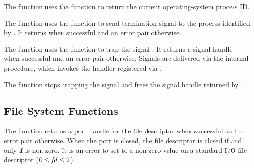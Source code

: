 \begin{function}
\end{function}

The  function uses the 
function to return the current operating-system process ID.

\begin{function}
\end{function}

The  function uses the  function to
send termination signal  to the process identified by
. It returns  when successful and an error pair
otherwise.

\begin{function}
\end{function}

The  function uses the 
function to trap the signal .
It returns a signal handle when successful and an error pair
otherwise.
Signals are delivered via the internal  procedure, which
invokes the handler registered via .

\begin{function}
\end{function}

The  function stops trapping the signal
and frees the signal handle returned by .

\subsection {File System Functions}

\begin{function}
\end{function}

The  function returns a port handle for the file
descriptor  when successful and an error pair otherwise. When
the port is closed, the file descriptor  is closed if and only
if  is non-zero. It is an error to set  to a
non-zero value on a standard I/O file descriptor ($0 \le \var{fd} \le
2$).

